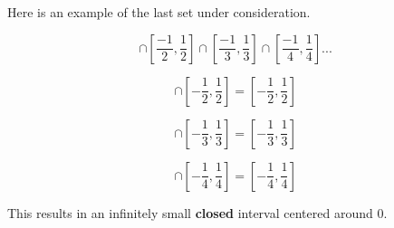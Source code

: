 \documentclass{article}
\begin{document}
Here is an example of the last set under consideration.

\begin{equation}
	[-1,1] \cap [\frac{-1}{2},\frac{1}{2}]\cap [\frac{-1}{3},\frac{1}{3}]\cap [\frac{-1}{4},\frac{1}{4}] ...
\end{equation}

\begin{equation}
	[-1,1] \cap [-\frac{1}{2},\frac{1}{2}] = [-\frac{1}{2},\frac{1}{2}]
\end{equation}

\begin{equation}
	[-\frac{1}{2},\frac{1}{2}] \cap [-\frac{1}{3},\frac{1}{3}] = [-\frac{1}{3},\frac{1}{3}]
\end{equation}

\begin{equation}
	[-\frac{1}{3},\frac{1}{3}] \cap [-\frac{1}{4},\frac{1}{4}] = [-\frac{1}{4},\frac{1}{4}]
\end{equation}

This results in an infinitely small {\bf closed} interval centered around $0$.
\end{document}
